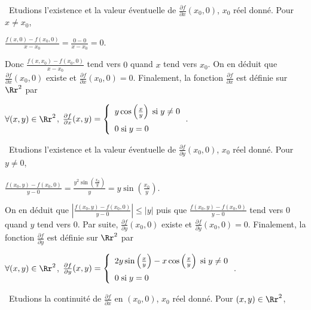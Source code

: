 {{\textbullet~Etudions l'existence et la valeur éventuelle de $ \frac{\partial f}{\partial x}(x_0,0)$, $x_0$ réel donné. Pour $x\neq x_0$,

\begin{center}
$ \frac{f(x,0)-f(x_0,0)}{x-x_0}= \frac{0-0}{x-x_0}=0$.
\end{center}

Donc $ \frac{f(x,x_0)-f(x_0,0)}{x-x_0}$ tend vers $0$ quand $x$ tend vers $x_0$. On en déduit que $ \frac{\partial f}{\partial x}(x_0,0)$ existe et $ \frac{\partial f}{\partial x}(x_0,0)=0$. Finalement, la fonction $ \frac{\partial f}{\partial x}$ est définie sur $\Rr^2$ par

\begin{center}
$\forall (x,y)\in\Rr^2$, $ \frac{\partial f}{\partial x}(x,y)=\left\{
\begin{array}{l}
y\cos\left( \frac{x}{y}\right)\;\text{si}\;y\neq0\\
\rule{0mm}{5mm}0\;\text{si}\;y=0
\end{array}
\right.$.
\end{center}

\textbullet~Etudions l'existence et la valeur éventuelle de $ \frac{\partial f}{\partial y}(x_0,0)$, $x_0$ réel donné. Pour $y\neq 0$,

\begin{center}
$ \frac{f(x_0,y)-f(x_0,0)}{y-0}= \frac{y^2\sin\left( \frac{x_0}{y}\right)}{y}=y\sin\left( \frac{x_0}{y}\right)$.
\end{center}

On en déduit que $\left| \frac{f(x_0,y)-f(x_0,0)}{y-0}\right|\leqslant|y|$ puis que $ \frac{f(x_0,y)-f(x_0,0)}{y-0}$ tend vers $0$ quand $y$ tend vers $0$. Par suite, $ \frac{\partial f}{\partial y}(x_0,0)$ existe et $ \frac{\partial f}{\partial y}(x_0,0)=0$. Finalement, la fonction $ \frac{\partial f}{\partial y}$ est définie sur $\Rr^2$ par

\begin{center}
$\forall (x,y)\in\Rr^2$, $ \frac{\partial f}{\partial y}(x,y)=\left\{
\begin{array}{l}
2y\sin\left( \frac{x}{y}\right)-x\cos\left( \frac{x}{y}\right)\;\text{si}\;y\neq0\\
\rule{0mm}{5mm}0\;\text{si}\;y=0
\end{array}
\right.$.
\end{center}

\textbullet~Etudions la continuité de $ \frac{\partial f}{\partial x}$ en $(x_0,0)$, $x_0$ réel donné. Pour $(x,y)\in\Rr^2$,

}}
